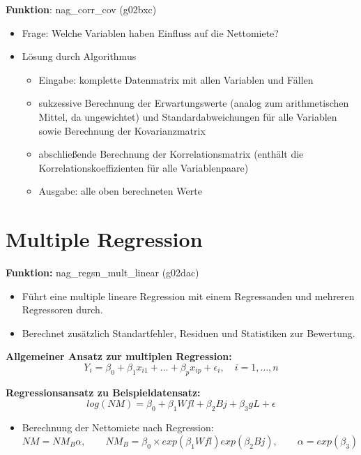 \documentclass[a4paper]{article}
\begin{document}
{\bf Funktion}: nag\_corr\_cov (g02bxc)\cite{nag:intro}
\begin{itemize}
	\item Frage: Welche Variablen haben Einfluss auf die Nettomiete?
	\item Lösung durch Algorithmus
		\begin{itemize}
			\item Eingabe: komplette Datenmatrix mit allen Variablen und Fällen
			\item sukzessive Berechnung der Erwartungswerte (analog zum arithmetischen Mittel, da ungewichtet) und Standardabweichungen für alle Variablen sowie Berechnung der Kovarianzmatrix
			\item abschließende Berechnung der Korrelationsmatrix (enthält die Korrelationskoeffizienten für alle Variablenpaare)
			\item Ausgabe: alle oben berechneten Werte
		\end{itemize}
	\end{itemize}

\section*{Multiple Regression}

{\bf Funktion:} nag\_regsn\_mult\_linear (g02dac)\cite{nag:intro}
\begin{itemize}
\item Führt eine multiple lineare Regression mit einem Regressanden und mehreren Regressoren durch.
\item Berechnet zusätzlich Standartfehler, Residuen und Statistiken zur Bewertung.
\end{itemize}

{\bf Allgemeiner Ansatz zur multiplen Regression:}\cite{Fahrmeier2010}
\begin{equation*}
  Y_i = \beta_0 + \beta_1 x_{i1} + \dots + \beta_p x_{ip} + \epsilon_i, \quad i = 1, \dots, n
\end{equation*}

{\bf Regressionsansatz zu Beispieldatensatz:}
\begin{equation*}
  log(NM) = \beta_0 + \beta_1 Wfl + \beta_2 Bj + \beta_3 gL + \epsilon
\end{equation*}
\begin{itemize}
\item Berechnung der Nettomiete nach Regression:
  \begin{equation*}
    NM = NM_B \alpha,\qquad
    NM_B = \beta_0 \times exp(\beta_1 Wfl) exp(\beta_2 Bj),\qquad
    \alpha = exp(\beta_3)
  \end{equation*}
\end{itemize}
\end{document}
